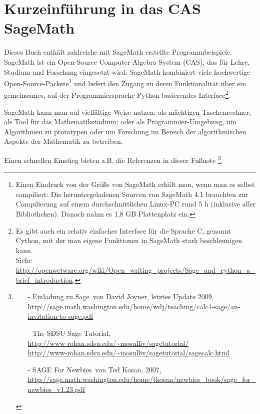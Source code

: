 
\hypertarget{appendix-using-sage}{}
\section{Kurzeinführung in das CAS SageMath}
\label{s:appendix-using-sage}



Dieses Buch enthält zahlreiche mit SageMath erstellte Programmbeispiele. SageMath ist
ein Open-Source Computer-Algebra-System (CAS), das für Lehre, Studium und Forschung
eingesetzt wird.
SageMath kombiniert viele hochwertige Open-Source-Packete\footnote{%
Einen Eindruck von der Größe von SageMath erhält man, wenn man es selbst compiliert:
Die heruntergeladenen Sourcen von SageMath 4.1 brauchten zur Compilierung auf einem
durchschnittlichen Linux-PC rund 5 h (inklusive aller Bibliotheken).
Danach nahm es 1,8 GB Plattenplatz ein.
}
und liefert den Zugang zu deren Funktionalität über ein gemeinsames, auf der
Programmiersprache Python basierendes Interface\footnote{%
Es gibt auch ein relativ einfaches Interface für die Sprache C, genannt Cython,
mit der man eigene Funktionen in SageMath stark beschleunigen kann.\\
Siehe \url{http://openwetware.org/wiki/Open_writing_projects/Sage_and_cython_a_brief_introduction}.
}.

SageMath kann man auf vielfältige Weise nutzen:
als mächtigen Taschenrechner; als Tool für das Mathematikstudium;
oder als Programmier-Umgebung, um Algorithmen zu prototypen oder um Forschung im
Bereich der algorithmischen Aspekte der Mathematik zu betreiben.

Einen schnellen Einstieg bieten z.B. die Referenzen in dieser Fußnote%
\footnote{%
\begin{itemize}
\item[-] \glqq Einladung zu Sage\grqq~von David Joyner, letztes Update 2009,\\
  \url{http://sage.math.washington.edu/home/wdj/teaching/calc1-sage/an-invitation-to-sage.pdf}
\item[-]\glqq The SDSU Sage Tutorial\grqq,\\
  \url{http://www-rohan.sdsu.edu/~mosulliv/sagetutorial/}\\
  \url{http://www-rohan.sdsu.edu/~mosulliv/sagetutorial/sagecalc.html}
 \item[-]\glqq SAGE For Newbies\grqq~von Ted Kosan, 2007,\\
  \url{http://sage.math.washington.edu/home/tkosan/newbies_book/sage_for_newbies_v1.23.pdf} \end{itemize}}.

